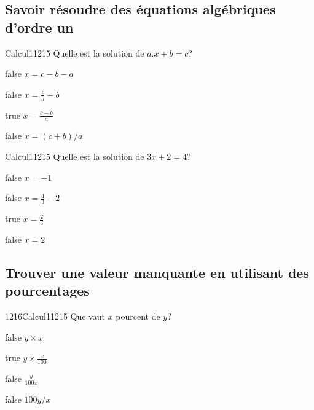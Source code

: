 \documentclass[11pt]{article}
\begin{document}
        \subsection{Savoir résoudre des équations algébriques d'ordre un}
        
        	\begin{question}{8}{Calcul}{1}{1215}
				Quelle est la solution de $a.x+b=c$?
            \end{question}

            \begin{reponses}
            	\item[false] $x=c-b-a$
            	\item[false] $x=\frac{c}{a}-b$
                \item[true] $x=\frac{c-b}{a}$
                \item[false] $x=(c+b)/a$
            \end{reponses}
        
        	\begin{question}{8}{Calcul}{1}{1215}
				Quelle est la solution de $3x+2=4$?
            \end{question}

            \begin{reponses}
            	\item[false] $x=-1$
            	\item[false] $x=\frac{4}{3}-2$
                \item[true] $x=\frac{2}{3}$
                \item[false] $x=2$
            \end{reponses}

        \subsection{Trouver une valeur manquante en utilisant des pourcentages}
        
        	\begin{question}{1216}{Calcul}{1}{1215}
				Que vaut $x$ pourcent de $y$?
            \end{question}

            \begin{reponses}
            	\item[false] $y\times x$
            	\item[true] $y\times \frac{x}{100}$
                \item[false] $\frac{y}{100x}$
                \item[false] $100y/x$
            \end{reponses}
        
\end{document}
